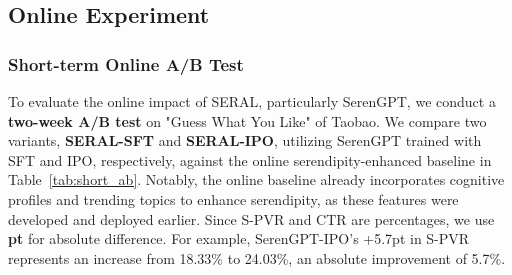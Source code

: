 \subsection{Online Experiment}\label{sec:online}
\subsubsection{Short-term Online A/B Test}\label{sec:short_ab}
To evaluate the online impact of SERAL, particularly SerenGPT, we conduct a \textbf{two-week A/B test} on "Guess What You Like" of Taobao. We compare two variants, \textbf{SERAL-SFT} and \textbf{SERAL-IPO}, utilizing SerenGPT trained with SFT and IPO, respectively, against the online serendipity-enhanced baseline in Table~\ref{tab:short_ab}. Notably, the online baseline already incorporates cognitive profiles and trending topics to enhance serendipity, as these features were developed and deployed earlier. Since S-PVR and CTR are percentages, we use \textbf{pt} for absolute difference. For example, SerenGPT-IPO's +5.7pt in S-PVR represents an increase from 18.33\% to 24.03\%, an absolute improvement of 5.7\%.
% 
